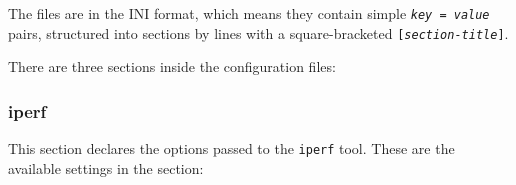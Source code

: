 \label{sec:parameters}

\noindent
The files are in the INI format, which means they contain simple {\tt\textit{key} = \textit{value}} pairs,
structured into sections by lines with a square-bracketed {\tt[\textit{section-title}]}.

%
%
%
There are three sections inside the configuration files:

\subsubsection{iperf}

\noindent
This section declares the options passed to the \verb|iperf| tool.
These are the available settings in the section:

